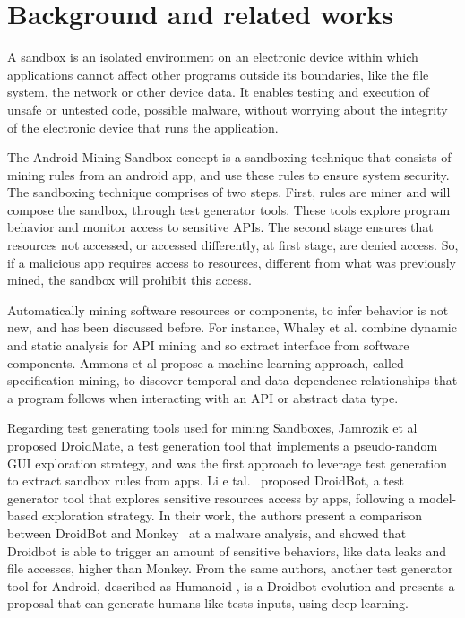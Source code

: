 \section{Background and related works}

A sandbox is an isolated environment on an electronic device within which applications cannot affect other programs outside its boundaries, like the file system, the network or other device data. It enables testing and execution of unsafe or untested code, possible malware, without worrying about the integrity of the electronic device that runs the application. 


The Android Mining Sandbox concept is a sandboxing technique that consists of mining rules from an android app, and use these rules to ensure system security. The sandboxing technique comprises of two steps. First, rules are miner and will compose the sandbox,
through test generator tools. These tools explore program behavior and monitor access to sensitive APIs. The second stage ensures that resources not accessed, or accessed differently, at first stage, are denied access. So, if a malicious app requires access to resources, different from what was previously mined, the sandbox will prohibit this access.

Automatically mining software resources or components, to infer behavior is not new, and has been discussed before. For instance, Whaley et al. \cite{DBLP:conf/issta/WhaleyML02} combine dynamic and static analysis for API mining and so extract interface from software components. Ammons et al \cite{DBLP:conf/popl/AmmonsBL02} propose a machine learning
approach, called specification mining, to discover temporal and data-dependence relationships that a program follows when interacting with an API or abstract data type.

Regarding test generating tools used for mining Sandboxes, Jamrozik et al \cite{DBLP:conf/icse/JamrozikZ16} proposed DroidMate, a test generation tool that implements a pseudo-random GUI exploration strategy, and was the first approach to leverage test generation to extract sandbox rules from apps. Li e tal.~\cite{DBLP:conf/icse/LiYGC17} proposed DroidBot, a test generator tool that explores sensitive resources access by apps, following a model-based exploration strategy. In their work, the authors present a comparison between DroidBot and Monkey~\cite{Monkey} at a malware analysis, and showed that Droidbot is able to trigger an amount of sensitive behaviors, like data leaks and file accesses, higher than Monkey. From the same authors, another test generator tool for Android, described as Humanoid \cite{DBLP:conf/kbse/LiY0C19}, is a Droidbot evolution and presents a proposal that can generate humans like tests inputs, using deep learning.

